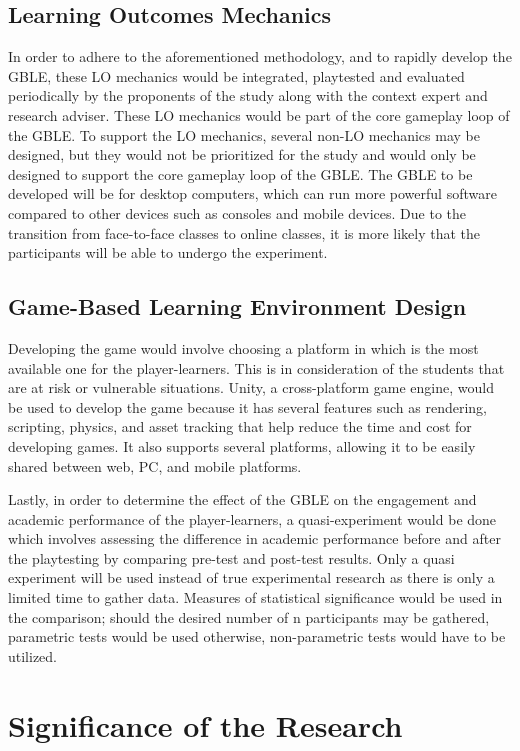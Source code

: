 \begin{subs}
\subsection{Learning Outcomes Mechanics}
In order to adhere to the aforementioned methodology, and to rapidly develop the GBLE, these LO mechanics would be integrated, playtested and evaluated periodically by the proponents of the study along with the context expert and research adviser. These LO mechanics would be part of the core gameplay loop of the GBLE. To support the LO mechanics, several non-LO mechanics may be designed, but they would not be prioritized for the study and would only be designed to support the core gameplay loop of the GBLE. The GBLE to be developed will be for desktop computers, which can run more powerful software compared to other devices such as consoles and mobile devices. Due to the transition from face-to-face classes to online classes, it is more likely that the participants will be able to undergo the experiment.

\subsection{Game-Based Learning Environment Design}
Developing the game would involve choosing a platform in which is the most available one for the player-learners. This is in consideration of the students that are at risk or vulnerable situations. Unity, a cross-platform game engine, would be used to develop the game because it has several features such as rendering, scripting, physics, and asset tracking that help reduce the time and cost for developing games. It also supports several platforms, allowing it to be easily shared between web, PC, and mobile platforms. 

Lastly, in order to determine the effect of the GBLE on the engagement and academic performance of the player-learners, a quasi-experiment would be done which involves assessing the difference in academic performance before and after the playtesting by comparing pre-test and post-test results. Only a quasi experiment will be used instead of true experimental research as there is only a limited time to gather data. Measures of statistical significance would be used in the comparison; should the desired number of n participants may be gathered, parametric tests would be used otherwise, non-parametric tests would have to be utilized.
\end{subs}

\section{Significance of the Research}
\label{sec:significance}

